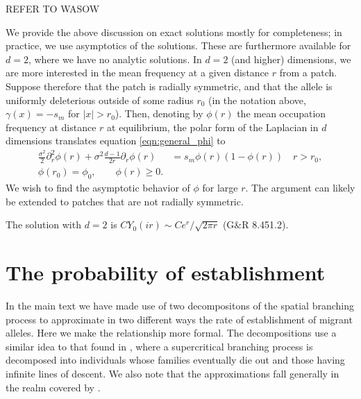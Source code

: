 \documentclass{article}
\begin{document}
REFER TO WASOW

We provide the above discussion on exact solutions mostly for completeness;
in practice, we use asymptotics of the solutions.
These are furthermore available for $d=2$, where we have no analytic solutions.
In $d=2$ (and higher) dimensions, we are more interested in the mean frequency at a given distance $r$ from a patch.
Suppose therefore that the patch is radially symmetric,
and that the allele is uniformly deleterious outside of some radius $r_0$
(in the notation above, $\gamma(x) = -s_m$ for $|x|>r_0$).
Then, denoting by $\phi(r)$ the mean occupation frequency at distance $r$ at equilibrium,
the polar form of the Laplacian in $d$ dimensions translates equation \eqref{eqn:general_phi} to
\begin{align}
  \label{eqn:radial_phi}
  \frac{\sigma^2}{2} \partial_{r}^2 \phi(r) + \sigma^2\frac{d-1}{2r} \partial_r \phi(r) &= s_m \phi(r) (1-\phi(r)) \quad r>r_0 , \\
  \phi(r_0) = \phi_0 , \qquad \phi(r) \ge 0 .
\end{align}
We wish to find the asymptotic behavior of $\phi$ for large $r$.
The argument can likely be extended to patches that are not radially symmetric.

The solution with $d=2$ is $C Y_0(ir) \sim C e^{r}/\sqrt{2 \pi r}$ (G\&R 8.451.2).



\section{The probability of establishment}
\label{ss:prob_estab}


In the main text we have made use of two decompositons of the spatial branching process
to approximate in two different ways the rate of establishment of migrant alleles.
Here we make the relationship more formal.
The decompositions use a similar idea to that found in \citep[section D.12]{athreyaney},
where a supercritical branching process is decomposed into individuals whose families eventually die out
and those having infinite lines of descent.
We also note that the approximations fall generally in the realm covered by \citet{aldouspoissonclumping}.
\end{document}
